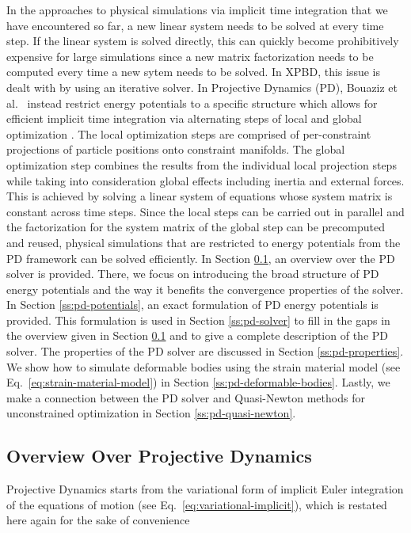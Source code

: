 In the approaches to physical simulations via implicit time integration that we have encountered so far, a new linear system needs to be solved
at every time step. If the linear system is solved directly, this can quickly become prohibitively expensive for large simulations since 
a new matrix factorization needs to be computed every time a new sytem needs to be solved. In XPBD, this issue is dealt with by using an iterative 
solver. In Projective Dynamics (PD), Bouaziz et al.\ \cite{bouaziz2014} instead restrict energy potentials to a specific structure 
which allows for efficient implicit time integration via alternating steps of local and global optimization \cite{bouaziz2014}. The local 
optimization steps are comprised of per-constraint projections of particle positions onto constraint manifolds. The global optimization 
step combines the results from the individual 
local projection steps while taking into consideration global effects including inertia and external forces. This is achieved by solving a 
linear system of equations whose system matrix is constant across time steps. Since the local steps can be carried out in parallel and the 
factorization for the system matrix of the global step can be precomputed and reused, physical simulations that are restricted to energy 
potentials from the PD framework can be solved efficiently. In Section \ref{ss:pd-overview}, an overview over the PD solver is provided. There, 
we focus on introducing the broad structure of PD energy potentials and the way it benefits the convergence properties of the solver. In 
Section \ref{ss:pd-potentials}, an exact formulation of PD energy potentials is provided. This formulation is used in Section \ref{ss:pd-solver} 
to fill in the gaps in the overview given in Section \ref{ss:pd-overview} and to give a complete description of the PD solver. The 
properties of the PD solver are discussed in Section \ref{ss:pd-properties}. We show how to simulate deformable bodies using the strain 
material model (see Eq.\ \ref{eq:strain-material-model}) in Section \ref{ss:pd-deformable-bodies}. Lastly, we make a connection between the PD 
solver and Quasi-Newton methods for unconstrained optimization in Section \ref{ss:pd-quasi-newton}.

\subsection{Overview Over Projective Dynamics}\label{ss:pd-overview}
Projective Dynamics starts from the variational form of implicit Euler integration of the equations of motion (see Eq.\ \ref{eq:variational-implicit}),
which is restated here again for the sake of convenience

